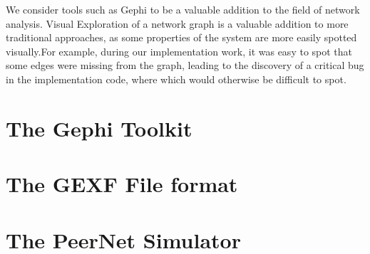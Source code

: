 We consider tools such as Gephi to be a valuable addition to the field
of network analysis. Visual Exploration of a network graph is a valuable
addition to more traditional approaches, as some properties of the
system are more easily spotted visually.For example, during our
implementation work, it was easy to spot that some edges were missing
from the graph, leading to the discovery of a critical bug in the
implementation code, where  which would otherwise be difficult to spot.

\section{The Gephi Toolkit}
\section{The GEXF File format}

\section{The PeerNet Simulator}
